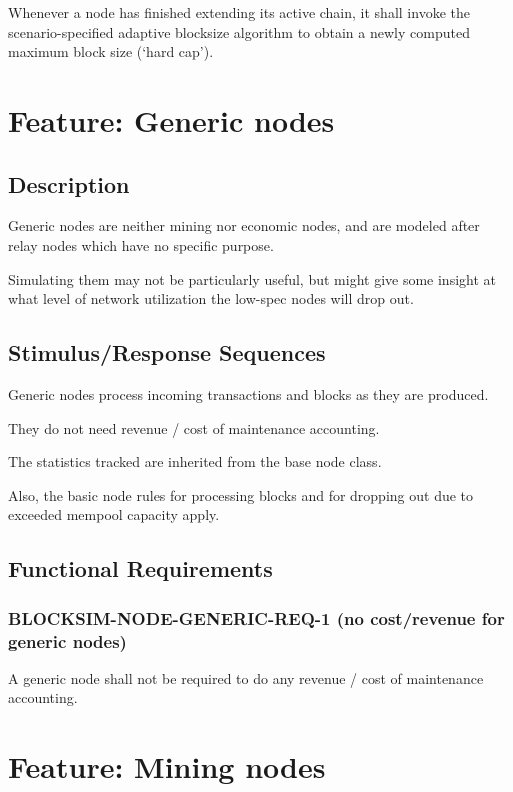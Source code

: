 \documentclass{scrreprt}
\begin{document}
        Whenever a node has finished extending its active chain, it shall
        invoke the scenario-specified adaptive blocksize algorithm to obtain
        a newly computed maximum block size (`hard cap').

  \section{Feature: Generic nodes}

    \subsection{Description}

      Generic nodes are neither mining nor economic nodes, and are modeled
      after relay nodes which have no specific purpose.

      Simulating them may not be particularly useful, but might give some
      insight at what level of network utilization the low-spec nodes will
      drop out.

    \subsection{Stimulus/Response Sequences}

      Generic nodes process incoming transactions and blocks as they are
      produced.

      They do not need revenue / cost of maintenance accounting.

      The statistics tracked are inherited from the base node class.

      Also, the basic node rules for processing blocks and for dropping out due
      to exceeded mempool capacity apply.

    \subsection{Functional Requirements}

      \subsubsection{BLOCKSIM-NODE-GENERIC-REQ-1 (no cost/revenue for generic nodes)}

        A generic node shall not be required to do any revenue / cost of
        maintenance accounting.

  \section{Feature: Mining nodes}
\end{document}

